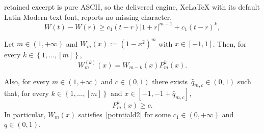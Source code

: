 \documentclass[10pt,a4paper]{amsart}
\renewcommand{\geq}{\geqslant}
\begin{document}
retained excerpt is pure ASCII, so the delivered engine, XeLaTeX with its default Latin Modern text font, reports no missing character.
\begin{equation}\label{potntiald2}
W(t)-W(r)\geq c_1(t-r)\left|1+r\right|^{m-1}+c_1(t-r)^k,
\end{equation}

\begin{prop}\label{colllise}
Let $m\in (1,+\infty)$ and $W_m(x):=(1-x^2)^m$ with $x\in[-1,1]$. Then, for every $k\in \left\lbrace 1,\dots, [m] \right\rbrace$,
\begin{equation}\label{telenious}
W_m^{(k)}(x)=W_{m-k}(x)P_m^k(x).
\end{equation}

Also, for every $m\in (1,+\infty)$ and $c\in (0,1)$ there exists~$\hat{q}_{m,c}\in (0,1)$ such that, for every $k\in \left\lbrace 1,\dots, \left[m\right] \right\rbrace$ and $x\in [-1,-1+\hat{q}_{m,c}]$, 
\begin{equation}\label{term-0987}
P_m^k(x)\geq c.
\end{equation}
In particular, $W_m(x)$ satisfies~\eqref{potntiald2} for some $c_1\in (0,+\infty)$ and $q\in (0,1)$. 
\end{prop}
\end{document}
